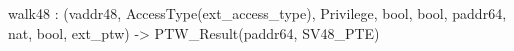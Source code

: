 walk48 : (vaddr48, AccessType(ext_access_type), Privilege, bool, bool, paddr64, nat, bool, ext_ptw) -> PTW_Result(paddr64, SV48_PTE)